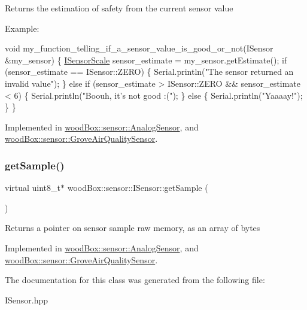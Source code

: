 Returns the estimation of safety from the current sensor value

Example\+:


\begin{DoxyCode}
\textcolor{keywordtype}{void} my\_function\_telling\_if\_a\_sensor\_value\_is\_good\_or\_not(ISensor &my\_sensor) \{
  \mbox{\hyperlink{classwood_box_1_1sensor_1_1_i_sensor_aa377bda61ed0d4a1d7e1a7bffe459452}{ISensorScale}} sensor\_estimate = my\_sensor.getEstimate();
  \textcolor{keywordflow}{if} (sensor\_estimate == ISensor::ZERO) \{
    Serial.println(\textcolor{stringliteral}{"The sensor returned an invalid value"});
  \}
  \textcolor{keywordflow}{else} \textcolor{keywordflow}{if} (sensor\_estimate > ISensor::ZERO && sensor\_estimate < 6) \{
    Serial.println(\textcolor{stringliteral}{"Boouh, it's not good :("});
  \}
  \textcolor{keywordflow}{else} \{
    Serial.println(\textcolor{stringliteral}{"Yaaaay!"});
  \}
\}
\end{DoxyCode}
 

Implemented in \mbox{\hyperlink{classwood_box_1_1sensor_1_1_analog_sensor_a74ddcfe84f3f5b9d7010442f365c4eee}{wood\+Box\+::sensor\+::\+Analog\+Sensor}}, and \mbox{\hyperlink{classwood_box_1_1sensor_1_1_grove_air_quality_sensor_a457e99f530b79f14db1de00cba3e81ff}{wood\+Box\+::sensor\+::\+Grove\+Air\+Quality\+Sensor}}.

\mbox{\label{classwood_box_1_1sensor_1_1_i_sensor_a9de8041b991b76cc2f6fcc3b6a1bf363}} 
\subsubsection{\texorpdfstring{get\+Sample()}{getSample()}}
{\footnotesize\ttfamily virtual uint8\+\_\+t$\ast$ wood\+Box\+::sensor\+::\+I\+Sensor\+::get\+Sample (\begin{DoxyParamCaption}{ }\end{DoxyParamCaption})\hspace{0.3cm}{\ttfamily [pure virtual]}}

Returns a pointer on sensor sample raw memory, as an array of bytes 

Implemented in \mbox{\hyperlink{classwood_box_1_1sensor_1_1_analog_sensor_ae78c25d8c01ba9acd03f90f278966189}{wood\+Box\+::sensor\+::\+Analog\+Sensor}}, and \mbox{\hyperlink{classwood_box_1_1sensor_1_1_grove_air_quality_sensor_a204d677110c9fe3c6b495bf9112e9afd}{wood\+Box\+::sensor\+::\+Grove\+Air\+Quality\+Sensor}}.



The documentation for this class was generated from the following file\+:\begin{DoxyCompactItemize}
\item 
I\+Sensor.\+hpp\end{DoxyCompactItemize}
